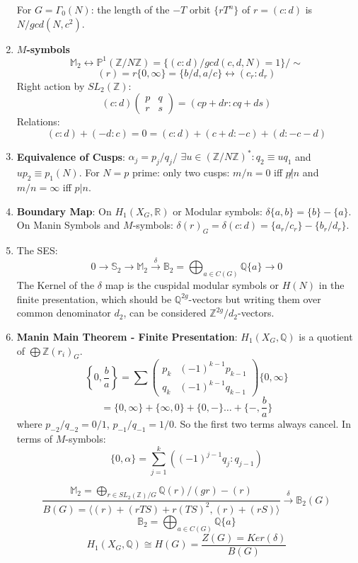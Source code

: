 \documentclass{article}
\newcommand{\Q}{\mathbb{Q}}
\newcommand{\R}{\mathbb{R}}
\newcommand{\Z}{\mathbb{Z}}
\newcommand{\PP}{\mathbb{P}}
\newcommand{\M}{\mathbb{M}}
\newcommand{\B}{\mathbb{B}}
\newcommand{\ra}{\rightarrow}
\newcommand{\lra}{\leftrightarrow}
\newcommand{\raa}[1]{\overset{#1}{\longrightarrow}}
\begin{document}
\begin{multicols}{2}
\begin{enumerate}
For $G = \Gamma_0(N)$: the length of the $-T$ orbit $\{rT^n\}$ of $r = (c:d)$ is $N/gcd(N,c^2)$. 

\item \textbf{$M$-symbols} 
\[\mathbb{M}_2 \lra \PP^1(\Z/N\Z) = \{(c:d)/gcd(c,d,N) = 1\}/\sim\]
\[(r) = r\{0,\infty\} = \{b/d,a/c\} \lra (c_r:d_r)\]
Right action by $SL_2(\Z)$:
\[(c:d) \left(\begin{array}{cc} p& q \\ r & s \end{array}\right) = (cp+dr: cq+ds)\]
Relations:
\[(c:d) + (-d:c) = 0 = (c:d) + (c+d:-c) + (d:-c-d)\]


\item \textbf{Equivalence of Cusps}: $\alpha_j = p_j/q_j$/ $\exists u \in (\Z/N\Z)^*: q_2 \equiv uq_1$ and $up_2 \equiv p_1 (N)$. For $N = p$ prime: only two cusps: $m/n = 0$ iff $p\not|n$ and $m/n = \infty$ iff $p|n$. 

\item \textbf{Boundary Map}: On $H_1(X_G,\R)$ or Modular symbols: $\delta\{a,b\} = \{b\}-\{a\}$. On Manin Symbols and $M$-symbols: $\delta(r)_G = \delta(c:d) = \{a_r/c_r\} - \{b_r/d_r\}$. 

\item The SES:
\[0 \ra \mathbb{S}_2 \ra  \M_2 \raa{\delta} \mathbb{B}_2 = \bigoplus_{a \in C(G)}\Q \{a\} \ra 0\]
The Kernel of the $\delta$ map is the cuspidal modular symbols or $H(N)$ in the finite presentation, which should be $\Q^{2g}$-vectors but writing them over common denominator $d_2$, can be considered $\Z^{2g}/d_2$-vectors. 


\item \textbf{Manin Main Theorem - Finite Presentation}:
$H_1(X_G,\Q)$ is a quotient of $\bigoplus \Z(r_i)_G$.\\
\[\left\{0,\frac{b}{a}\right\} = \sum \left(\begin{array}{cc} p_k  & (-1)^{k-1} p_{k-1} \\ q_k & (-1)^{k-1} q_{k-1}\end{array}\right)\{0,\infty\}\]\[= \{0, \infty\} + \{\infty,0\} + \{0,-\}\ldots + \{-,\frac{b}{a}\}\]
where $p_{-2}/q_{-2} = 0/1$, $p_{-1}/q_{-1} = 1/0$. So the first two terms always cancel. In terms of $M$-symbols:
\[\{0,\alpha\} = \sum_{j=1}^k ((-1)^{j-1}q_j: q_{j-1})\]

\[\frac{\M_2 = \bigoplus_{r \in SL_2(\Z)/G} \Q(r)/(gr)-(r)}{B(G) = \langle (r)+(rTS)+r(TS)^2, (r) + (rS)\rangle}  \raa{\delta} \B_2(G)\]
\[\B_2 = \bigoplus_{a\in C(G)} \Q\{a\}\]
\[H_1(X_G,\Q) \cong H(G) = \frac{Z(G)=Ker(\delta)}{B(G)}\]


\end{enumerate}
\end{multicols}
\end{document}
